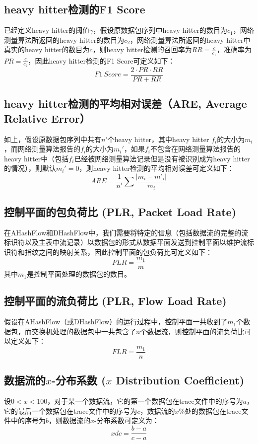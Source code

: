 \documentclass{article}
\begin{document}
\subsection{ heavy hitter检测的F1 Score}
已经定义heavy hitter的阈值$\gamma$，假设原数据包序列中heavy hitter的数目为$c_1$，网络测量算法所返回的heavy hitter的数目为$c_2$，网络测量算法所返回的heavy hitter中真实的heavy hitter的数目为$c$，则heavy hitter检测的召回率为$RR=\frac{c}{c_1}$，准确率为$PR=\frac{c}{c_2}$，因此heavy hitter检测的F1 Score可定义如下：
$$
F1~Score=\frac{2\cdot PR \cdot RR}{PR + RR}
$$

\subsection{ heavy hitter检测的平均相对误差（ARE, Average Relative Error）}
如上，假设原数据包序列中共有$n'$个heavy hitter，其中heavy hitter $f_i$的大小为$m_i$，而网络测量算法报告的$f_i$的大小为$m_i'$，如果$f_i$不包含在网络测量算法报告的heavy hitter中（包括$f_i$已经被网络测量算法记录但是没有被识别成为heavy hitter的情况），则默认$m_i'=0$，则heavy hitter检测的平均相对误差可定义如下：
$$
ARE = \frac{1}{n'}\sum\frac{|m_i - m'_i|}{m_i}
$$

\subsection{ 控制平面的包负荷比 (PLR, Packet Load Rate)}
在AHashFlow和DHashFlow中，我们需要将特定的信息（包括数据流的完整的流标识符以及主表中流记录）以数据包的形式从数据平面发送到控制平面以维护流标识符和指纹之间的映射关系，因此控制平面的包负荷比可定义如下：
$$
PLR = \frac{m_1}{m}
$$
其中$m_1$是控制平面处理的数据包的数目。

\subsection{控制平面的流负荷比 (PLR, Flow Load Rate)}
假设在AHashFlow（或DHashFlow）的运行过程中，控制平面一共收到了$m_1$个数据包，而交换机处理的数据包中一共包含了$n$个数据流，则控制平面的流负荷比可以定义如下：
$$
FLR = \frac{m_1}{n}
$$

\subsection{数据流的$x$-分布系数 ($x$ Distribution Coefficient)}
设$0<x<100$，对于某一个数据流，它的第一个数据包在trace文件中的序号为$a$，它的最后一个数据包在trace文件中的序号为$c$，数据流的$x\%$处的数据包在trace文件中的序号为$b$，则数据流的$x$-分布系数可定义为：
$$
xdc = \frac{b - a}{c - a}
$$
\end{document}
